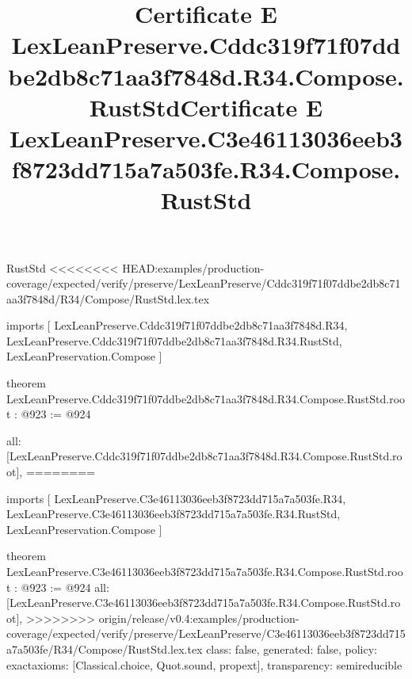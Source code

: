 \begin{lexlean}{RustStd}
<<<<<<<< HEAD:examples/production-coverage/expected/verify/preserve/LexLeanPreserve/Cddc319f71f07ddbe2db8c71aa3f7848d/R34/Compose/RustStd.lex.tex
\title{Certificate E LexLeanPreserve.Cddc319f71f07ddbe2db8c71aa3f7848d.R34.Compose.RustStd}
\begin{coremodule}
imports [
  LexLeanPreserve.Cddc319f71f07ddbe2db8c71aa3f7848d.R34,
  LexLeanPreserve.Cddc319f71f07ddbe2db8c71aa3f7848d.R34.RustStd,
  LexLeanPreservation.Compose
]

theorem LexLeanPreserve.Cddc319f71f07ddbe2db8c71aa3f7848d.R34.Compose.RustStd.root : @923 := @924 {
  all: [LexLeanPreserve.Cddc319f71f07ddbe2db8c71aa3f7848d.R34.Compose.RustStd.root],
========
\title{Certificate E LexLeanPreserve.C3e46113036eeb3f8723dd715a7a503fe.R34.Compose.RustStd}
\begin{coremodule}
imports [
  LexLeanPreserve.C3e46113036eeb3f8723dd715a7a503fe.R34,
  LexLeanPreserve.C3e46113036eeb3f8723dd715a7a503fe.R34.RustStd,
  LexLeanPreservation.Compose
]

theorem LexLeanPreserve.C3e46113036eeb3f8723dd715a7a503fe.R34.Compose.RustStd.root : @923 := @924 {
  all: [LexLeanPreserve.C3e46113036eeb3f8723dd715a7a503fe.R34.Compose.RustStd.root],
>>>>>>>> origin/release/v0.4:examples/production-coverage/expected/verify/preserve/LexLeanPreserve/C3e46113036eeb3f8723dd715a7a503fe/R34/Compose/RustStd.lex.tex
  class: false,
  generated: false,
  policy: exact{axioms: [Classical.choice, Quot.sound, propext]},
  transparency: semireducible
}


\end{coremodule}}
\end{coremodule}
\end{lexlean}

